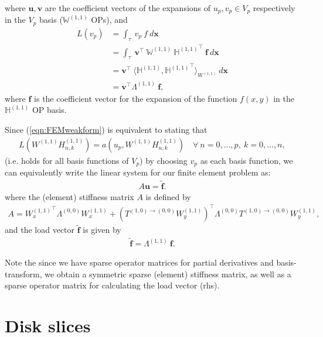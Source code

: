 \documentclass[11pt, oneside]{article}   	%
\newcommand{\hdop}{H}
\newcommand{\Wii}{W^{(1,1)}}
\newcommand{\hdopii}{\hdop^{(1,1)}}
\newcommand{\bighdopii}{{\mathbb{\hdop}^{(1,1)}}}
\newcommand{\element}{\tau}
\newcommand{\bigWii}{{\mathbb{W}^{(1,1)}}}
\begin{document}
where $\mathbf{u}, \mathbf{v}$ are the coefficient vectors of the expansions of $u_p, v_p \in V_p$ respectively in the $V_p$ basis ($\bigWii$ OPs), and
\begin{align*}
	L(v_p) &= \int_\element \: v_p \: f \: d\mathbf{x} \\
	&= \int_\element \: \mathbf{v}^\top \: \bigWii \: \bighdopii^\top \: \mathbf{f} \: d\mathbf{x} \\
	&= \mathbf{v}^\top \: \langle \bighdopii, {\bighdopii}^\top \rangle_{\Wii} \: d\mathbf{x} \\
	&= \mathbf{v}^\top \Lambda^{(1,1)} \: \mathbf{f},
\end{align*}
where $\mathbf{f}$ is the coefficient vector for the expansion of the function $f(x,y)$ in the $\bighdopii$ OP basis.

Since (\ref{eqn:FEMweakform}) is equivalent to stating that
\begin{align*}
	L(\Wii \hdopii_{n,k}) = a(u_p,\Wii \hdopii_{n,k}) \quad \forall \: n = 0,\dots,p, \: k = 0,\dots,n,
\end{align*}
(i.e. holds for all basis functions of $V_p$) by choosing $v_p$ as each basis function, we can equivalently write the linear system for our finite element problem as:
\begin{align*}
A\mathbf{u} = \tilde{\mathbf{f}}.
\end{align*}
where the (element) stiffness matrix $A$ is defined by 
\begin{align*}
A = {\Wii_x}^\top \Lambda^{(0,0)} \Wii_x + ({T^{(1,0)\to(0,0)} \Wii_y})^\top \Lambda^{(0,0)} T^{(1,0)\to(0,0)} \Wii_y, 
\end{align*}
and the load vector $\tilde{\mathbf{f}}$ is given by 
\begin{align*}
\tilde{\mathbf{f}} = \Lambda^{(1,1)} \: \mathbf{f}.
\end{align*}

Note the since we have sparse operator matrices for partial derivatives and basis-transform, we obtain a symmetric sparse (element) stiffness matrix, as well as a sparse operator matrix for calculating the load vector (rhs).

\section{Disk slices}\label{Appendix:DiskSlices}
\end{document}
